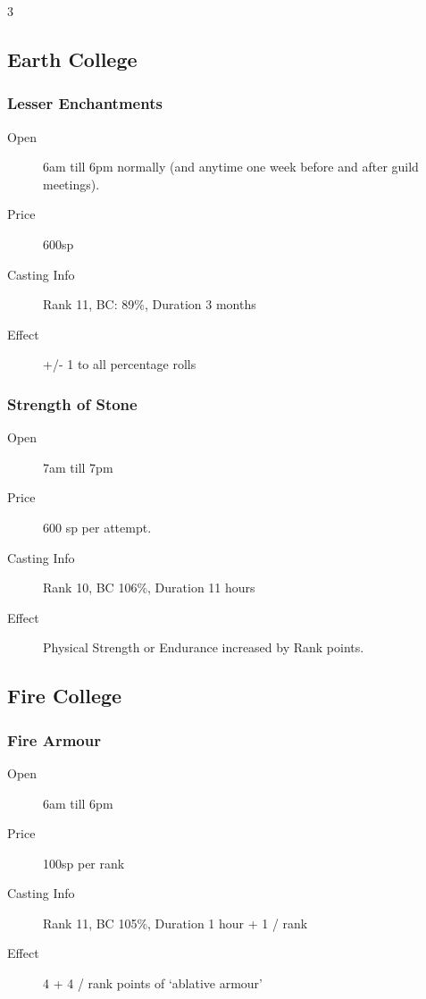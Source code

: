 \begin{multicols}{3}
\subsection{Earth College}

\subsubsection{Lesser Enchantments}

\begin{description}
\item[Open] 6am till 6pm normally (and anytime one week before and
  after guild meetings).
\item[Price] 600sp
\item[Casting Info] Rank 11, BC: 89\%, Duration 3 months
\item[Effect] +/- 1 to all percentage rolls
\end{description}

\subsubsection{Strength of Stone}

\begin{description}
\item[Open] 7am till 7pm
\item[Price] 600 sp per attempt.
\item[Casting Info] Rank 10, BC 106\%, Duration 11 hours
\item[Effect] Physical Strength or Endurance
increased by Rank points.
\end{description}
  
\subsection{Fire College}

\subsubsection{Fire Armour}

\begin{description}
\item[Open] 6am till 6pm
\item[Price] 100sp per rank
\item[Casting Info] Rank 11, BC 105\%, Duration 1 hour + 1 / rank
\item[Effect] 4 + 4 / rank points of ‘ablative armour’
\end{description}


\end{multicols}
